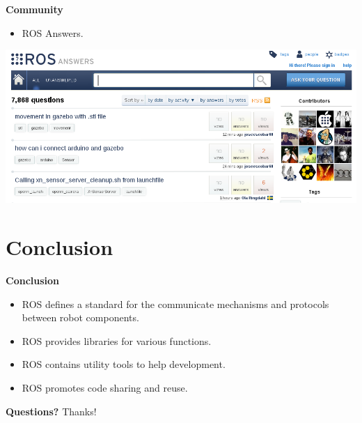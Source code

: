\documentclass[a4paper, 10pt, conference]{ieeeconf}       %
\begin{document}
\textbf{Community}

\begin{itemize}
  \item ROS Answers.
\end{itemize}
\begin{center}
  \includegraphics[width=\textwidth]{ros_answers}
\end{center}


\section{Conclusion}

\textbf{Conclusion}

\begin{itemize}
  \item ROS defines a standard for the communicate mechanisms and protocols between robot components.
  \item ROS provides libraries for various functions.
  \item ROS contains utility tools to help development.
  \item ROS promotes code sharing and reuse.
\end{itemize}

\textbf{Questions?}
Thanks!


  
\end{document}
